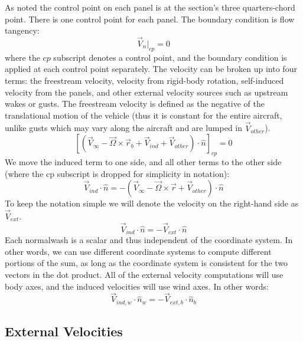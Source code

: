 \documentclass{article}
\begin{document}
As noted the control point on each panel is at the section's three quarters-chord point.  There is one control point for each panel.  The boundary condition is flow tangency:
\begin{equation}
    \vec{V}_n|_{cp} = 0
\end{equation}
where the $cp$ subscript denotes a control point, and the boundary condition is applied at each control point separately.  The velocity can be broken up into four terms: the freestream velocity, velocity from rigid-body rotation, self-induced velocity from the panels, and other external velocity sources such as upstream wakes or gusts.  The freestream velocity is defined as the negative of the translational motion of the vehicle (thus it is constant for the entire aircraft, unlike gusts which may vary along the aircraft and are lumped in $\vec V_{other}$).
\begin{equation}
    \left[(\vec{V}_\infty - \vec{\Omega} \times \vec{r}_b + \vec{V}_{ind} + \vec{V}_{other}) \cdot \hat{n} \right]_{cp}= 0
\end{equation}
We move the induced term to one side, and all other terms to the other side (where the cp subscript is dropped for simplicity in notation):
\begin{equation}
    \vec{V}_{ind} \cdot \hat{n} = - (\vec{V}_\infty - \vec{\Omega} \times \vec{r} +  \vec{V}_{other}) \cdot \hat{n}
\end{equation}
To keep the notation simple we will denote the velocity on the right-hand side as $\vec V_{ext}$.
\begin{equation}
\vec{V}_{ind} \cdot \hat{n} = - \vec{V}_{ext} \cdot \hat{n}
\end{equation}
Each normalwash is a scalar and thus independent of the coordinate system.  In other words, we can use different coordinate systems to compute different portions of the sum, as long as the coordinate system is consistent for the two vectors in the dot product.  All of the external velocity computations  will use body axes, and the induced velocities will use wind axes.  In other words:
\begin{equation}
\vec{V}_{ind, w} \cdot \hat{n}_w = - \vec{V}_{ext, b} \cdot \hat{n}_b
\label{eq:flowtangency}
\end{equation}

\subsection{External Velocities}
\end{document}
